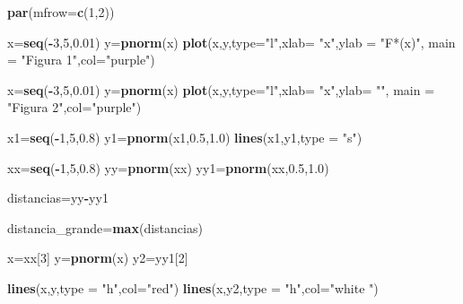 \documentclass[a4paper,oneside,openany]{book}
\newenvironment{Shaded}{\begin{snugshade}}{\end{snugshade}}
\newcommand{\KeywordTok}[1]{\textcolor[rgb]{0.13,0.29,0.53}{\textbf{#1}}}
\newcommand{\DataTypeTok}[1]{\textcolor[rgb]{0.13,0.29,0.53}{#1}}
\newcommand{\DecValTok}[1]{\textcolor[rgb]{0.00,0.00,0.81}{#1}}
\newcommand{\FloatTok}[1]{\textcolor[rgb]{0.00,0.00,0.81}{#1}}
\newcommand{\StringTok}[1]{\textcolor[rgb]{0.31,0.60,0.02}{#1}}
\newcommand{\OperatorTok}[1]{\textcolor[rgb]{0.81,0.36,0.00}{\textbf{#1}}}
\newcommand{\NormalTok}[1]{#1}
\begin{document}
\begin{Shaded}
\begin{Highlighting}[]
\KeywordTok{par}\NormalTok{(}\DataTypeTok{mfrow=}\KeywordTok{c}\NormalTok{(}\DecValTok{1}\NormalTok{,}\DecValTok{2}\NormalTok{))}

\NormalTok{x=}\KeywordTok{seq}\NormalTok{(}\OperatorTok{-}\DecValTok{3}\NormalTok{,}\DecValTok{5}\NormalTok{,}\FloatTok{0.01}\NormalTok{)}
\NormalTok{y=}\KeywordTok{pnorm}\NormalTok{(x)}
\KeywordTok{plot}\NormalTok{(x,y,}\DataTypeTok{type=}\StringTok{"l"}\NormalTok{,}\DataTypeTok{xlab=} \StringTok{"x"}\NormalTok{,}\DataTypeTok{ylab =} \StringTok{"F*(x)"}\NormalTok{, }\DataTypeTok{main =} \StringTok{"Figura 1"}\NormalTok{,}\DataTypeTok{col=}\StringTok{"purple"}\NormalTok{)}

\NormalTok{x=}\KeywordTok{seq}\NormalTok{(}\OperatorTok{-}\DecValTok{3}\NormalTok{,}\DecValTok{5}\NormalTok{,}\FloatTok{0.01}\NormalTok{)}
\NormalTok{y=}\KeywordTok{pnorm}\NormalTok{(x)}
\KeywordTok{plot}\NormalTok{(x,y,}\DataTypeTok{type=}\StringTok{"l"}\NormalTok{,}\DataTypeTok{xlab=} \StringTok{"x"}\NormalTok{,}\DataTypeTok{ylab=} \StringTok{""}\NormalTok{, }\DataTypeTok{main =} \StringTok{"Figura 2"}\NormalTok{,}\DataTypeTok{col=}\StringTok{"purple"}\NormalTok{)}

\NormalTok{x1=}\KeywordTok{seq}\NormalTok{(}\OperatorTok{-}\DecValTok{1}\NormalTok{,}\DecValTok{5}\NormalTok{,}\FloatTok{0.8}\NormalTok{)}
\NormalTok{y1=}\KeywordTok{pnorm}\NormalTok{(x1,}\FloatTok{0.5}\NormalTok{,}\FloatTok{1.0}\NormalTok{)}
\KeywordTok{lines}\NormalTok{(x1,y1,}\DataTypeTok{type =} \StringTok{"s"}\NormalTok{)}

\NormalTok{xx=}\KeywordTok{seq}\NormalTok{(}\OperatorTok{-}\DecValTok{1}\NormalTok{,}\DecValTok{5}\NormalTok{,}\FloatTok{0.8}\NormalTok{)}
\NormalTok{yy=}\KeywordTok{pnorm}\NormalTok{(xx)}
\NormalTok{yy1=}\KeywordTok{pnorm}\NormalTok{(xx,}\FloatTok{0.5}\NormalTok{,}\FloatTok{1.0}\NormalTok{)}

\NormalTok{distancias=yy}\OperatorTok{-}\NormalTok{yy1}

\NormalTok{distancia_grande=}\KeywordTok{max}\NormalTok{(distancias)}


\NormalTok{x=xx[}\DecValTok{3}\NormalTok{]}
\NormalTok{y=}\KeywordTok{pnorm}\NormalTok{(x)}
\NormalTok{y2=yy1[}\DecValTok{2}\NormalTok{]}

\KeywordTok{lines}\NormalTok{(x,y,}\DataTypeTok{type =} \StringTok{"h"}\NormalTok{,}\DataTypeTok{col=}\StringTok{"red"}\NormalTok{)}
\KeywordTok{lines}\NormalTok{(x,y2,}\DataTypeTok{type =} \StringTok{"h"}\NormalTok{,}\DataTypeTok{col=}\StringTok{"white "}\NormalTok{)}


\end{Highlighting}
\end{Shaded}
\end{document}
